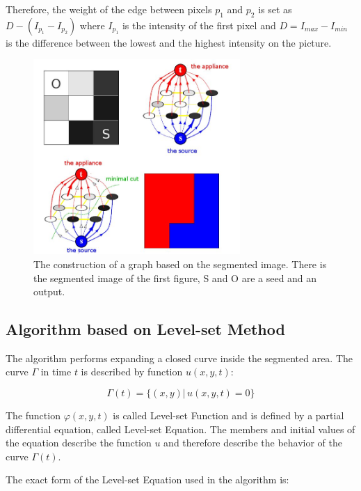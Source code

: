 Therefore, the weight of the edge between pixels $p_{1}$ and $p_{2}$ is set as $D - \left(I_{p_{1}} - I_{p_{2}} \right)$ where $I_{p_{1}}$ is the intensity of the first pixel and $D = I_{max} - I_{min}$ is the difference between the lowest and the highest intensity on the picture\cite{loucky}.

\begin{figure}[!H]
 	\caption{The construction of a graph based on the segmented image. There is the segmented image of the first figure, S and O are a seed and an output. \label{fig:grafy}}
	\begin{center}
	\includegraphics[width=0.7\textwidth]{Text/IMG/grafy.jpg}
	\end{center}
\end{figure}

\subsection{Algorithm based on Level-set Method}
The algorithm performs expanding a closed curve inside the segmented area. The curve $\Gamma$ in time $t$ is described by function $u(x,y,t)$:

\begin{equation}
\label{lvsfunction}
\Gamma(t) = \{(x, y)|\, u(x,y,t) = 0 \}
\end{equation}

The function $\varphi(x,y,t)$ is called Level-set Function and is defined by a partial differential equation, called Level-set Equation. The members and initial values of the equation describe the function $u$ and therefore describe the behavior of the curve $\Gamma(t)$.

The exact form of the Level-set Equation used in the algorithm is:

